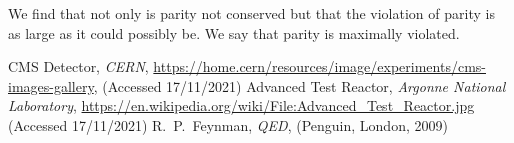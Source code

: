 \documentclass[fleqn]{NotesClass}
\begin{document}
    We find that not only is parity not conserved but that the violation of parity is as large as it could possibly be.
    We say that parity is maximally violated.
    
    
    \backmatter
    \begin{thebibliography}{9}
         CMS Detector, \textit{CERN}, \url{https://home.cern/resources/image/experiments/cms-images-gallery}, (Accessed 17/11/2021)
         Advanced Test Reactor, \textit{Argonne National Laboratory}, \url{https://en.wikipedia.org/wiki/File:Advanced_Test_Reactor.jpg} (Accessed 17/11/2021)
         R.~P.~Feynman, \textit{QED}, (Penguin, London, 2009)
    \end{thebibliography}
    \renewcommand{\glossaryname}{Acronyms}
    \printglossary[acronym]
    \printindex
\end{document}
